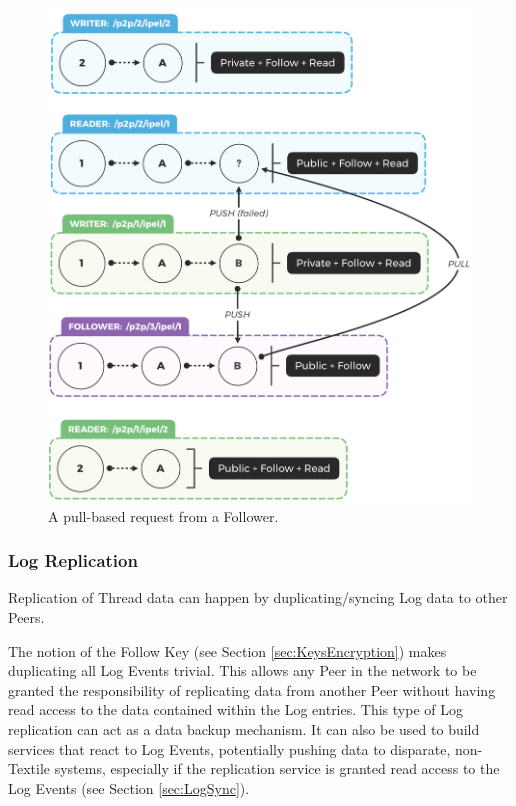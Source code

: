 \documentclass{textile}
\begin{document}
\begin{figure}
  \includegraphics[width=\linewidth]{figures/Pulling.png}
  \caption{A pull-based request from a Follower.}
  \label{fig:Pulling}
\end{figure}

\subsubsection{Log Replication}

Replication of Thread data can happen by duplicating/syncing Log data to other Peers.

The notion of the Follow Key (see Section  \ref{sec:KeysEncryption}) makes duplicating all Log Events trivial. This allows any Peer in the network to be granted the responsibility of replicating data from another Peer without having read access to the data contained within the Log entries. This type of Log replication can act as a data backup mechanism. It can also be used to build services that react to Log Events, potentially pushing data to disparate, non-Textile systems, especially if the replication service is granted read access to the Log Events (see Section  \ref{sec:LogSync}).
\end{document}
